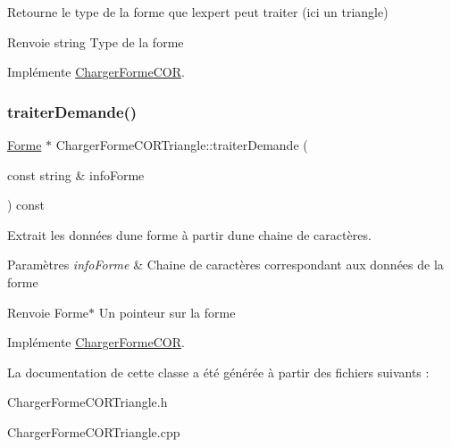 Retourne le type de la forme que l\textquotesingle{}expert peut traiter (ici un triangle) 

\begin{DoxyReturn}{Renvoie}
string Type de la forme 
\end{DoxyReturn}


Implémente \mbox{\hyperlink{class_charger_forme_c_o_r_ae740eabcd9b3cc3809c1fe5ffd0100a1}{Charger\+Forme\+C\+OR}}.

\mbox{\label{class_charger_forme_c_o_r_triangle_aaa2b1605bb747f29a559f966754237a2}} 
\subsubsection{\texorpdfstring{traiterDemande()}{traiterDemande()}}
{\footnotesize\ttfamily \mbox{\hyperlink{class_forme}{Forme}} $\ast$ Charger\+Forme\+C\+O\+R\+Triangle\+::traiter\+Demande (\begin{DoxyParamCaption}\item[{const string \&}]{info\+Forme }\end{DoxyParamCaption}) const\hspace{0.3cm}{\ttfamily [virtual]}}



Extrait les données d\textquotesingle{}une forme à partir d\textquotesingle{}une chaine de caractères. 


\begin{DoxyParams}{Paramètres}
{\em info\+Forme} & Chaine de caractères correspondant aux données de la forme \\
\hline
\end{DoxyParams}
\begin{DoxyReturn}{Renvoie}
Forme$\ast$ Un pointeur sur la forme 
\end{DoxyReturn}


Implémente \mbox{\hyperlink{class_charger_forme_c_o_r_a1d9563c3a1ff9d6d86aa87a83bdaf8da}{Charger\+Forme\+C\+OR}}.



La documentation de cette classe a été générée à partir des fichiers suivants \+:\begin{DoxyCompactItemize}
\item 
Charger\+Forme\+C\+O\+R\+Triangle.\+h\item 
Charger\+Forme\+C\+O\+R\+Triangle.\+cpp\end{DoxyCompactItemize}
